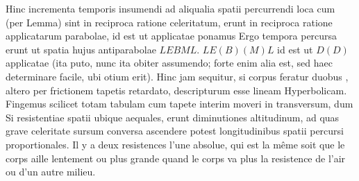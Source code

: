 \pend
\pstart
Hinc incrementa temporis insumendi ad aliqualia spatii percurrendi
loca cum (per Lemma) sint in reciproca ratione celeritatum,
erunt in reciproca ratione applicatarum parabolae,
id est ut applicatae
ponamus
Ergo tempora percursa\protect{}
erunt ut spatia hujus antiparabolae $\displaystyle LEBML.$ $\displaystyle LE(B)(M)L$
id est ut
$\displaystyle D(D)$ applicatae
(ita puto, nunc ita obiter assumendo;
forte enim alia est, sed haec determinare facile, ubi otium erit).
\pend
\pstart
Hinc jam sequitur, si corpus feratur duobus
,
altero per frictionem tapetis retardato,
descripturum esse lineam Hyperbolicam.
Fingemus scilicet totam tabulam cum tapete interim moveri in transversum,
dum 
\pend
\pstart
Si resistentiae\protect{}
spatii ubique aequales,
erunt diminutiones altitudinum,
ad quas grave celeritate sursum conversa
ascendere potest longitudinibus
spatii percursi\protect{}
proportionales.
\pend
\pstart
Il y a deux resistences l'une absolue,
qui est la m\^{e}me soit que le corps aille lentement ou
plus grande quand le corps va plus
la resistence de l'air ou d'un autre milieu.
